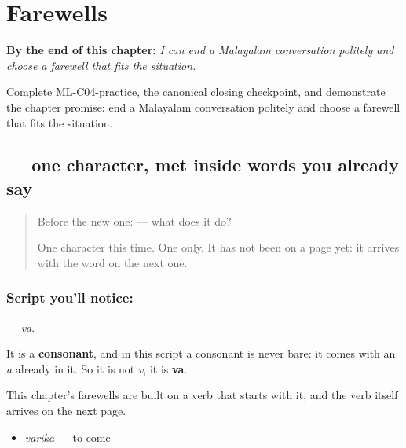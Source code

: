 
\chapter{Farewells}
\label{ch:farewells}

\begin{chapteropening}
\textbf{By the end of this chapter:} \emph{I can end a Malayalam conversation politely and choose a farewell that fits the situation.}

Complete ML-C04-practice, the canonical closing checkpoint, and demonstrate the chapter promise: end a Malayalam conversation politely and choose a farewell that fits the situation.
\end{chapteropening}

\section[\texorpdfstring{\ml{വ} (va)}{വ (va)}]{ — one character, met inside words you already say}

\label{lesson:ML-S110-letter-va}



\begin{quote}
Before the new one:  — what does it do?

One character this time. One only. It has not been on a page yet: it arrives with the word on the next one.
\end{quote}

\subsection*{Script you'll notice: }
\textbf{} — \emph{va}.

It is a \textbf{consonant}, and in this script a consonant is never bare: it comes with an \emph{a} already in it. So it is not \emph{v}, it is \textbf{va}.

This chapter's farewells are built on a verb that starts with it, and the verb itself arrives on the next page.

\begin{itemize}
\raggedright
  \item \textbf{} \emph{varika} — to come
\end{itemize}


